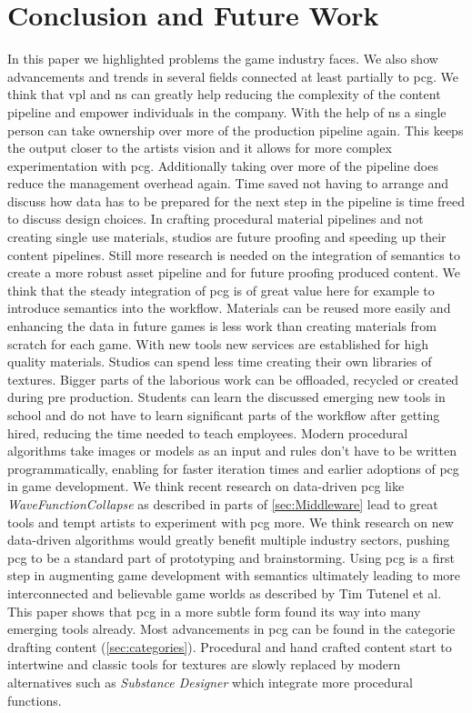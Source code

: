 \documentclass[10pt,a4paper]{article}
\begin{document}
\section{Conclusion and Future Work}
\begin{multicols}{2}
In this paper we highlighted problems the game industry faces. We also show advancements and trends in several fields connected at least partially to \gls{pcg}. We think that \gls{vpl} and \gls{ns} can greatly help reducing the complexity of the content pipeline and empower individuals in the company. With the help of \gls{ns} a single person can take ownership over more of the production pipeline again. This keeps the output closer to the artists vision and it allows for more complex experimentation with \gls{pcg}. Additionally taking over more of the pipeline does reduce the management overhead again. Time saved not having to arrange and discuss how data has to be prepared for the next step in the pipeline is time freed to discuss design choices. In crafting procedural material pipelines and not creating single use materials, studios are future proofing and speeding up their content pipelines. Still more research is needed on the integration of semantics to create a more robust asset pipeline and for future proofing produced content. We think that the steady integration of \gls{pcg} is of great value here for example to introduce semantics into the workflow. Materials can be reused more easily and enhancing the data in future games is less work than creating materials from scratch for each game. With new tools new services are established for high quality materials. Studios can spend less time creating their own libraries of textures. Bigger parts of the laborious work can be offloaded, recycled or created during pre production. Students can learn the discussed emerging new tools in school and do not have to learn significant parts of the workflow after getting hired, reducing the time needed to teach employees. Modern procedural algorithms take images or models as an input and rules don’t have to be written programmatically, enabling for faster iteration times and earlier adoptions of \gls{pcg} in game development. We think recent research on data-driven \gls{pcg} like \textit{WaveFunctionCollapse} as described in parts of \autoref{sec:Middleware} lead to great tools and tempt artists to experiment with \gls{pcg} more. We think research on new data-driven algorithms would greatly benefit multiple industry sectors, pushing \gls{pcg} to be a standard part of prototyping and brainstorming. Using \gls{pcg} is a first step in augmenting game development with semantics ultimately leading to more interconnected and believable game worlds as described by Tim Tutenel et al. This paper shows that \gls{pcg} in a more subtle form found its way into many emerging tools already. Most advancements in \gls{pcg} can be found in the categorie drafting content (\autoref{sec:categories}). Procedural and hand crafted content start to intertwine and classic tools for textures are slowly replaced by modern alternatives such as \textit{Substance Designer} which integrate more procedural functions.
\end{multicols}
\end{document}
